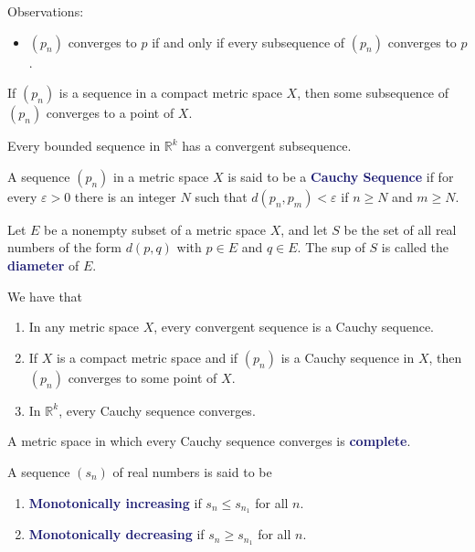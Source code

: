 \documentclass[11pt]{article}
\numberwithin{equation}{section}
\newcommand{\navy}[1]{\textcolor{MidnightBlue}{\bf #1}}
\theoremstyle{definition}
\theoremstyle{definition}
\newcommand{\1}{\mathbbm 1}
\newcommand{\e}{\varepsilon}
\newcommand{\RR}{\mathbb R}
\begin{document}
Observations:
\begin{itemize}
	\item $(p_n)$ converges to $p$ if and only if every subsequence of $(p_n)$ converges to $p$. 
\end{itemize}

\begin{theorem}
	If $(p_n)$ is a sequence in a compact metric space $X$, then some subsequence of $(p_n)$ converges to a point of $X$.
\end{theorem}

\begin{theorem}
	Every bounded sequence in $\RR^k$ has a convergent subsequence.
\end{theorem}

\begin{definition}
	A sequence $(p_n)$ in a metric space $X$ is said to be a \navy{Cauchy Sequence} if for every $\e > 0$ there is an integer $N$ such that $d(p_n, p_m) < \e$ if $n \geq N$ and $m \geq N$.
\end{definition}

\begin{definition}[Diameter]
	Let $E$ be a nonempty subset of a metric space $X$, and let $S$ be the set of all real numbers of the form $d(p,q)$ with $p \in E$ and $q \in E$. The sup of $S$ is called the \navy{diameter} of $E$.
\end{definition}

\begin{theorem}
	We have that
\begin{enumerate}
	\item In any metric space $X$, every convergent sequence is a Cauchy sequence.
	\item If $X$ is a compact metric space and if $(p_n)$ is a Cauchy sequence in $X$, then $(p_n)$ converges to some point of $X$.
	\item In $\RR^k$, every Cauchy sequence converges. 
\end{enumerate}
\end{theorem}

\begin{definition}[Complete]
	A metric space in which every Cauchy sequence converges is \navy{complete}.
\end{definition}

\begin{definition}
	A sequence $(s_n)$ of real numbers is said to be
	\begin{enumerate}
		\item \navy{Monotonically increasing} if $s_n \leq s_{n_1}$ for all $n$.
		\item \navy{Monotonically decreasing} if $s_n \geq s_{n_1}$ for all $n$.
	\end{enumerate}
\end{definition}
\end{document}

